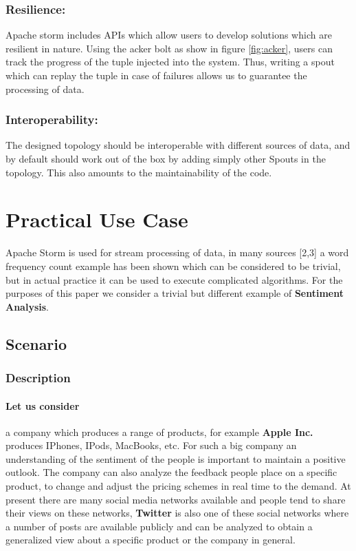 \documentclass[runningheads,a4paper]{llncs}[2015/06/24]
\begin{document}
\subsubsection{Resilience:} Apache storm includes APIs which allow users to develop solutions which are resilient in nature. Using the acker bolt as show in figure \ref{fig:acker}, users can track the progress of the tuple injected into the system. Thus, writing a spout which can replay the tuple in case of failures allows us to guarantee the processing of data.
\subsubsection{Interoperability:} The designed topology should be interoperable with different sources of data, and by default should work out of the box by adding simply other Spouts in the topology. This also amounts to the maintainability of the code.



\section{Practical Use Case}
Apache Storm is used for stream processing of data, in many sources [2,3] a word frequency count example has been shown which can be considered to be trivial, but in actual practice it can be used to execute complicated algorithms. For the purposes of this paper we consider a trivial but different example of \textbf{Sentiment Analysis}.

\subsection{Scenario}

\subsubsection{Description}
\paragraph{Let us consider} a company which produces a range of products, for example \textbf{Apple Inc.} produces IPhones, IPods, MacBooks, etc. For such a big company an understanding of the sentiment of the people is important to maintain a positive outlook. The company can also analyze the feedback people place on a specific product, to change and adjust the pricing schemes in real time to the demand.  At present there are many social media networks available and people tend to share their views on these networks,  \textbf{Twitter} is also one of these social networks where a number of posts are available publicly and can be analyzed to obtain a generalized view about a specific product or the company in general.
\end{document}
